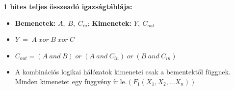 \documentclass[11pt,a4paper]{article}
\begin{document}
            \begin{tcolorbox}[colback=blue!5!white,colframe=blue!50!black,title= 8. Ismertesse az 1 bites teljes összeadó példáján keresztül a kombinációs logikai hálózatok elvét!]
                \textbf{1 bites teljes összeadó igazságtáblája:}
                \begin{center}
                \end{center}
                \begin{itemize}
                    \item \textbf{Bemenetek:} \(A,\hspace{3pt}B,\hspace{3pt}C_{in}\); \textbf{Kimenetek:} \(Y,\hspace{3pt}C_{out}\)
                    \item \(Y\hspace{3pt}=\hspace{3pt}A\hspace{3pt}xor\hspace{3pt}B\hspace{3pt}xor\hspace{3pt}C\)
                    \item \(C_{out} = (A\hspace{3pt}and\hspace{3pt}B)\hspace{3pt}or\hspace{3pt}(A\hspace{3pt}and\hspace{3pt}C_{in})\hspace{3pt}or\hspace{3pt}(B\hspace{3pt}and\hspace{3pt}C_{in})\)
                    \item A kombinációs logikai hálózatok kimenetei csak a bementektől függnek. Minden kimenetet egy függvény ír le.\((F_1(X_1, X_2, ... X_n))\)
                \end{itemize}
            \end{tcolorbox}
\end{document}
